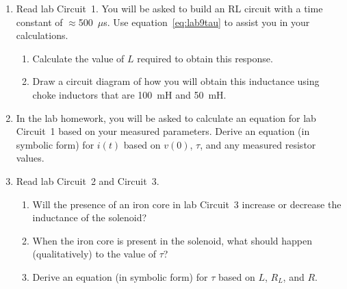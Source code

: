 \renewcommand{\labNumber}{9}
\renewcommand{\labName}{Inductors and RL Circuits}

\preLab

\begin{enumerate}


\item Read lab Circuit~1. You will be asked to build an RL circuit with a time constant of $\approx$500~$\mu$s. Use equation~\ref{eq:lab9tau} to assist you in your calculations.
\begin{enumerate}
	\item Calculate the value of $L$ required to obtain this response.
	
	\item Draw a circuit diagram of how you will obtain this inductance using choke inductors that are 100~mH and 50~mH.
\end{enumerate}

\item In the lab homework, you will be asked to calculate an equation for lab Circuit~1 based on your measured parameters. Derive an equation (in symbolic form) for $i(t)$ based on $v(0)$, $\tau$, and any measured resistor values.



\clearpage


\item Read lab Circuit~2 and Circuit~3. 
\begin{enumerate}
	\item Will the presence of an iron core in lab Circuit~3 increase or decrease the inductance of the solenoid?
	
	\item When the iron core is present in the solenoid, what should happen (qualitatively) to the value of $\tau$?
	
	\item Derive an equation (in symbolic form) for $\tau$ based on $L$, $R_L$, and $R$.
\end{enumerate}

\clearpage


\end{enumerate}
